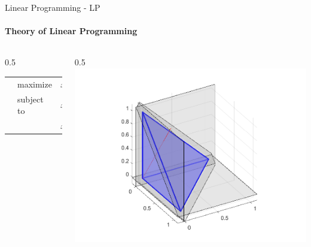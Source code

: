 \documentclass{beamer}
\begin{document}
	\begin{frame}{Linear Programming - LP}
		\framesubtitle{Theory of Linear Programming}
		\begin{columns}[T]
			\begin{column}{0.5\textwidth}
				\small
				\begin{tabularx}{\textwidth}{X l l X}
					& maximize		& $x + y + 3z$		& \\
					& subject to	& $x+y+z-1\leq 0$	& \\
					&				& $x, y, z\geq 0$ &
				\end{tabularx}
			\end{column}
			\begin{column}{0.5\textwidth}
				\includegraphics[width=\textwidth]{images/slides_ex2_3d.png}
			\end{column}
		\end{columns}
	\end{frame}	
\end{document}
